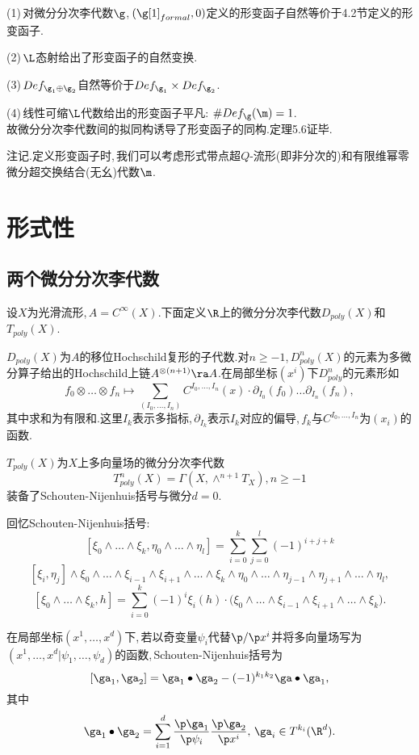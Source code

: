 (1)\,对微分分次李代数$\g$,\,$(\g[1]_{formal},0)$定义的形变函子自然等价于4.2节定义的形变函子.

(2)\,$\L$态射给出了形变函子的自然变换.

(3)\,$Def_{\g_1\oplus\g_2}$自然等价于$Def_{\g_1}\times Def_{\g_2}$.

(4)\,线性可缩$\L$代数给出的形变函子平凡: $\#Def_\g(\m)=1$.
\\
故微分分次李代数间的拟同构诱导了形变函子的同构.定理5.6证毕.

注记.定义形变函子时,\,我们可以考虑形式带点超$Q$-流形(即非分次的)和有限维幂零微分超交换结合(无幺)代数$\m$.



\section{形式性}

\subsection{两个微分分次李代数}

设$X$为光滑流形,\,$A=C^\infty (X)$.下面定义$\R$上的微分分次李代数$D_{poly}(X)$和$T_{poly}(X)$.

$D_{poly}(X)$为$A$的移位Hochschild复形的子代数.对$n\ge -1$,\,$D^n_{poly}(X)$的元素为多微分算子给出的Hochschild上链$A^{\otimes (n+1)}\ra A$.在局部坐标$(x^i)$下$D^n_{poly}$的元素形如
$$f_0\otimes\dots\otimes f_n\mapsto\sum_{(I_0,\dots,I_n)} 
   C^{I_0,\dots,I_n}(x)\cdot 
   \partial_{I_0}(f_0)
   \dots\partial_{I_n}(f_n),$$
其中求和为有限和.这里$I_k$表示多指标,\,$\partial_{I_k}$表示$I_k$对应的偏导,\,$f_k$与$C^{I_0,\dots,I_n}$为$(x_i)$的函数.

$T_{poly}(X)$为$X$上多向量场的微分分次李代数
$$T^n_{poly}(X)=\Gamma(X,\wedge^{n+1} T_X),n\ge -1$$
装备了Schouten-Nijenhuis括号与微分$d=0$.

回忆Schouten-Nijenhuis括号:\,
$$[\xi_0\wedge\dots\wedge\xi_k,\eta_0\wedge\dots\wedge\eta_l]=\sum_{i=0}^k\sum_{j=0}^l (-1)^{i+j+k}$$
   $$
   [\xi_i,\eta_j]\wedge\xi_0\wedge
   \dots\wedge\xi_{i-1}\wedge\xi_{i+1}\wedge\dots\wedge
   \xi_k\wedge\eta_0\wedge\dots\wedge \eta_{j-1}\wedge\eta_{j+1}\wedge\dots
   \wedge\eta_l,
   $$
   $$[\xi_0\wedge\dots\wedge\xi_k,h]=
   \sum_{i=0}^k (-1)^i \xi_i(h)\cdot\bigl(\xi_0\wedge
   \dots\wedge\xi_{i-1}\wedge\xi_{i+1}\wedge\dots\wedge
   \xi_k\bigr).$$
   
在局部坐标$(x^1,\dots ,x ^d)$下,\,若以奇变量$\psi_i$代替$\p/\p x^i$并将多向量场写为$(x^1,\dots,x^d|\psi_1,\dots,\psi_d)$的函数,\,Schouten-Nijenhuis括号为
$$[\ga_1,\ga_2]=\ga_1\bullet \ga_2-(-1)^{k_1 k_2} \ga\bullet \ga_1,$$
其中
$$\ga_1\bullet \ga_2= \sum_{i=1}^d
     {\p \ga_1\over\p \psi_i}{\p\ga_2\over \p x^i},\,\ga_i\in
      T^{k_i}(\R^d).$$



